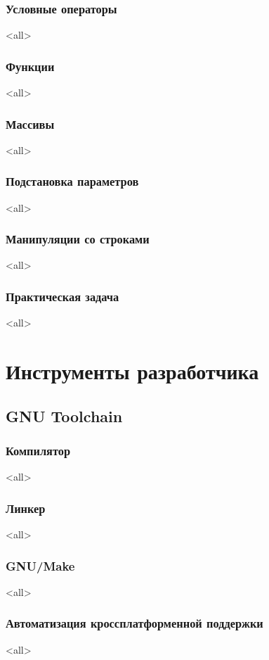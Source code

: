 \section{Условные операторы}
\mode<all>{}
\section{Функции}
\mode<all>{}
\section{Массивы}
\mode<all>{}
\section{Подстановка параметров}
\mode<all>{}
\section{Манипуляции со строками}
\mode<all>{}
\section{Практическая задача}
\mode<all>{}

\part{Инструменты разработчика}
\chapter{GNU Toolchain}
\section{Компилятор}
\mode<all>{}
\section{Линкер}
\mode<all>{}
\section{GNU/Make}
\mode<all>{}

\section{Автоматизация кроссплатформенной поддержки}
\mode<all>{}

